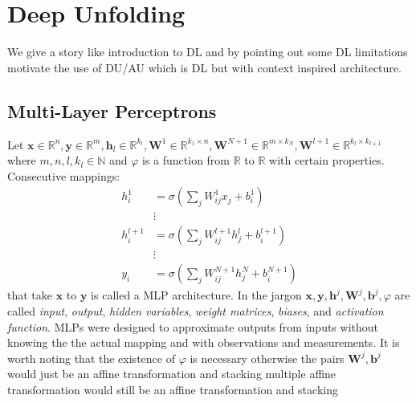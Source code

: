 \chapter{Deep Unfolding}

We give a story like introduction to \ac{DL} and by pointing out some \ac{DL} limitations motivate the use of \ac{DU}/\ac{AU} 
which is \ac{DL} but with context inspired architecture.

\section{Multi-Layer Perceptrons}
Let $\boldsymbol{x} \in \mathbb{R}^n,\boldsymbol{y} \in \mathbb{R}^m, \boldsymbol{h}_l \in \mathbb{R}^{k_l}, \boldsymbol{W}^1 \in \mathbb{R}^{k_1 \times n}
,\boldsymbol{W}^{N+1} \in \mathbb{R}^{m \times k_N},\boldsymbol{W}^{l+1} \in \mathbb{R}^{k_l \times k_{l+1}}$ where $m,n,l,k_l \in \mathbb{N}$ and $\varphi$ is a
function from $\mathbb{R}$ to $\mathbb{R}$ with certain properties. 
Consecutive mappings:
\begin{equation}
  \begin{split}
    h_i^{1}   &= \sigma \left( \sum_{j}^{} W_{ij}^{1}x_j + b_i^{1} \right)\\ 
              & \vdots\\
    h_i^{l+1} &= \sigma \left( \sum_{j}^{} W_{ij}^{l+1}h_j^l + b_i^{l+1} \right)\\
              & \vdots\\
    y_i^{}    &= \sigma \left( \sum_{j}^{} W_{ij}^{N+1}h_j^N + b_i^{N+1} \right)
  \end{split}
  \end{equation}
that take $\boldsymbol{x}$ to $\boldsymbol{y}$ is called a \ac{MLP} architecture.
In the \ml jargon $\boldsymbol{x},\boldsymbol{y},\boldsymbol{h}^j,\boldsymbol{W}^j,\boldsymbol{b}^j,\varphi$ are called \emph{input}, \emph{output}, \emph{hidden variables},
\emph{weight matrices}, \emph{biases}, and \emph{activation function}. \ac{MLP}s were designed to approximate outputs from inputs without knowing the the actual mapping and with observations and measurements. 
It is worth noting that the existence of $\varphi$ is necessary otherwise the pairs $\boldsymbol{W}^j,\boldsymbol{b}^j$ would 
just be an affine transformation and stacking multiple affine transformation would still be an affine transformation and stacking 
